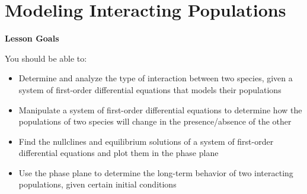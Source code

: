 \documentclass[main]{subfiles}
\begin{document}
\ifSubfilesClassLoaded{%
  \chaptermark{\chapterthree}
}{}

\section{Modeling Interacting Populations} \label{ws3-9}
\begin{framed}
\centerline{\textbf{Lesson Goals}}

You should be able to:
\begin{itemize}
\item Determine and analyze the type of interaction between two species, given a system of first-order differential equations that models their populations
\item Manipulate a system of first-order differential equations to determine how the populations of two species will change in the presence/absence of the other
\item Find the nullclines and equilibrium solutions of a system of first-order differential equations and plot them in the phase plane
\item Use the phase plane to determine the long-term behavior of two interacting populations, given certain initial conditions

\end{itemize}
\end{framed}
\end{document}
